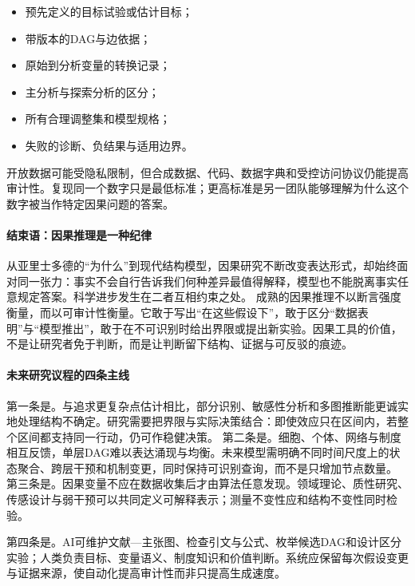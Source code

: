 \begin{itemize}
  \item 预先定义的目标试验或估计目标；
  \item 带版本的DAG与边依据；
  \item 原始到分析变量的转换记录；
  \item 主分析与探索分析的区分；
  \item 所有合理调整集和模型规格；
  \item 失败的诊断、负结果与适用边界。
\end{itemize}

开放数据可能受隐私限制，但合成数据、代码、数据字典和受控访问协议仍能提高审计性。复现同一个数字只是最低标准；更高标准是另一团队能够理解为什么这个数字被当作特定因果问题的答案。

\paragraph{结束语：因果推理是一种纪律}

从亚里士多德的“为什么”到现代结构模型，因果研究不断改变表达形式，却始终面对同一张力：事实不会自行告诉我们何种差异最值得解释，模型也不能脱离事实任意规定答案。科学进步发生在二者互相约束之处。
成熟的因果推理不以断言强度衡量，而以可审计性衡量。它敢于写出“在这些假设下”，敢于区分“数据表明”与“模型推出”，敢于在不可识别时给出界限或提出新实验。因果工具的价值，不是让研究者免于判断，而是让判断留下结构、证据与可反驳的痕迹。

\paragraph{未来研究议程的四条主线}

第一条是。与追求更复杂点估计相比，部分识别、敏感性分析和多图推断能更诚实地处理结构不确定。研究需要把界限与实际决策结合：即使效应只在区间内，若整个区间都支持同一行动，仍可作稳健决策。
第二条是。细胞、个体、网络与制度相互反馈，单层DAG难以表达涌现与均衡。未来模型需明确不同时间尺度上的状态聚合、跨层干预和机制变更，同时保持可识别查询，而不是只增加节点数量。
第三条是。因果变量不应在数据收集后才由算法任意发现。领域理论、质性研究、传感设计与弱干预可以共同定义可解释表示；测量不变性应和结构不变性同时检验。

第四条是。AI可维护文献---主张图、检查引文与公式、枚举候选DAG和设计区分实验；人类负责目标、变量语义、制度知识和价值判断。系统应保留每次假设变更与证据来源，使自动化提高审计性而非只提高生成速度。

